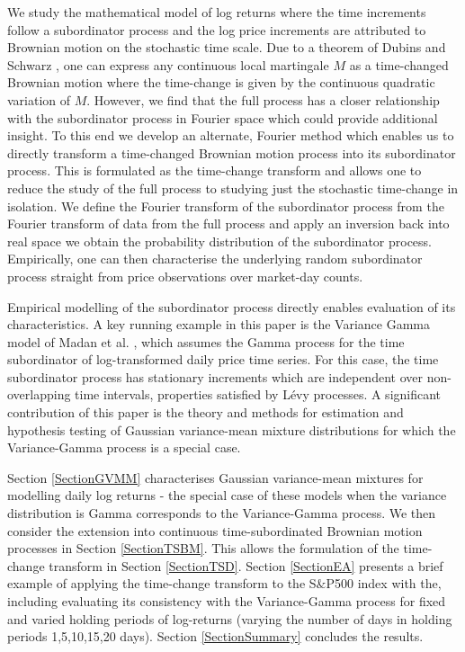 \documentclass{article}
\begin{document}
We study the mathematical model of log returns where the time increments follow a subordinator process  and the log price increments are attributed to Brownian motion on the stochastic time scale. Due to a theorem of Dubins and Schwarz \cite{DubinsSchwarz}, one can express any continuous local martingale $M$ as a time-changed Brownian motion where the time-change is given by the continuous quadratic variation of $M$. However, we find that the full process has a closer relationship with the subordinator process in Fourier space which could provide additional insight. To this end we develop an alternate, Fourier method which enables us to directly transform a time-changed Brownian motion process into its subordinator process. This is formulated as the time-change transform and allows one to reduce the study of the full process to studying just the stochastic time-change in isolation. We define the Fourier transform of the subordinator process from the Fourier transform of data from the full process and apply an inversion back into real space we obtain the probability distribution of the subordinator process.
Empirically, one can then characterise the underlying random subordinator process straight from price observations over market-day counts.

Empirical modelling of the subordinator process directly enables evaluation of its characteristics. A key running example in this paper is the Variance Gamma model of Madan et al. \cite{MadanMilne}, \cite{MadanCarrChang} which assumes the Gamma process for the time subordinator of log-transformed daily price time series.  For this case, the time subordinator process  has stationary increments which are independent over non-overlapping time intervals, properties satisfied by Lévy processes. A significant contribution of this paper is the theory and methods for estimation and hypothesis testing of Gaussian variance-mean mixture distributions for which the Variance-Gamma process is a special case.

Section \ref{SectionGVMM} characterises Gaussian variance-mean mixtures for modelling daily log returns - the special case of these models when the variance distribution is Gamma corresponds to the Variance-Gamma process. We then consider the extension into continuous time-subordinated Brownian motion processes in Section \ref{SectionTSBM}. This allows the formulation of the time-change transform in Section \ref{SectionTSD}.  Section \ref{SectionEA} presents a brief example of applying the time-change transform to the S$\&$P500 index with the, including evaluating its consistency with the Variance-Gamma process for fixed and varied holding periods of log-returns (varying the number of days in holding periods 1,5,10,15,20 days). Section \ref{SectionSummary} concludes the results.
\end{document}
